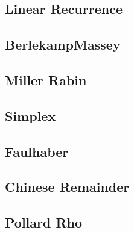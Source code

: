 \documentclass[a4paper,10pt,twocolumn,oneside]{article}
\begin{document}
\subsection{Linear Recurrence}


\subsection{BerlekampMassey}


\subsection{Miller Rabin}


%

\subsection{Simplex}


\subsection{Faulhaber}


\subsection{Chinese Remainder}


\subsection{Pollard Rho}


%

%
\end{document}
